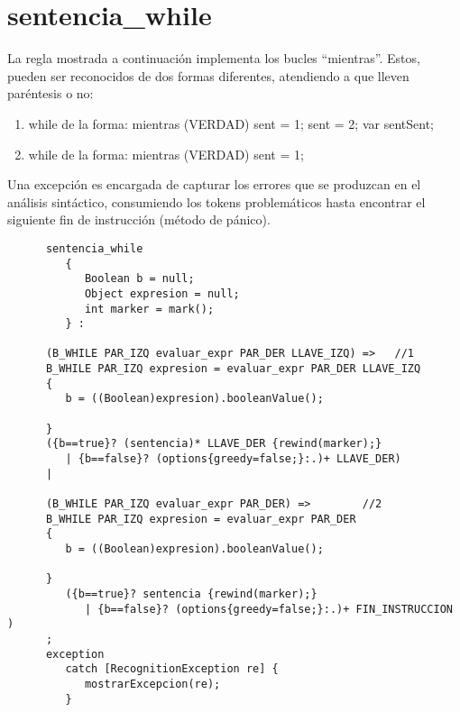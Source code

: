    \section{sentencia\_while}
   La regla mostrada a continuación implementa los bucles ``mientras''. Estos, pueden ser reconocidos de dos formas diferentes,
   atendiendo a que lleven paréntesis o no:
   \begin{enumerate}
      \item while de la forma: mientras (VERDAD) { sent = 1; sent = 2; var sentSent; }
      \item while de la forma: mientras (VERDAD) sent = 1;
   \end{enumerate}
   Una excepción es encargada de capturar los errores que se produzcan en el análisis sintáctico, consumiendo los tokens
   problemáticos hasta encontrar el siguiente fin de instrucción (método de pánico).
   \begin{lstlisting}
      sentencia_while
         {
            Boolean b = null; 
            Object expresion = null; 
            int marker = mark();
         } :
      
      (B_WHILE PAR_IZQ evaluar_expr PAR_DER LLAVE_IZQ) =>   //1
      B_WHILE PAR_IZQ expresion = evaluar_expr PAR_DER LLAVE_IZQ
      {
         b = ((Boolean)expresion).booleanValue();
            
      } 
      ({b==true}? (sentencia)* LLAVE_DER {rewind(marker);}
         | {b==false}? (options{greedy=false;}:.)+ LLAVE_DER) 
      |
      
      (B_WHILE PAR_IZQ evaluar_expr PAR_DER) =>        //2
      B_WHILE PAR_IZQ expresion = evaluar_expr PAR_DER
      {
         b = ((Boolean)expresion).booleanValue();
            
      } 
         ({b==true}? sentencia {rewind(marker);}
            | {b==false}? (options{greedy=false;}:.)+ FIN_INSTRUCCION )
      ;
      exception
         catch [RecognitionException re] {
            mostrarExcepcion(re);
         }
   \end{lstlisting}


